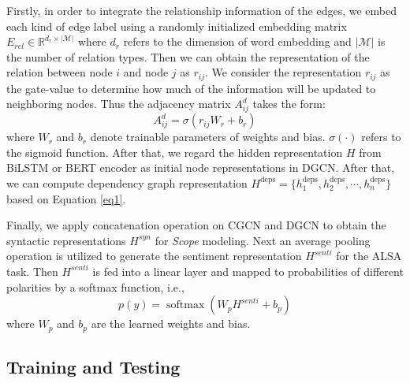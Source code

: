 \documentclass{article}
\begin{document}
Firstly, in order to integrate the relationship information of the edges, we  embed each kind of edge label using a randomly initialized embedding matrix $E_{rel} \in \mathbb{R}^{d_r \times |\mathcal{M}|}$ where $d_r$ refers to the dimension of word embedding and $|\mathcal{M}|$ is the number of relation types. Then we can obtain the representation of the relation between node $i$ and node $j$ as $r_{ij}$. We consider the representation $r_{ij}$ as the gate-value to determine how much of the information will be updated to neighboring nodes. Thus the adjacency matrix $A_{ij}^{d}$ takes the form:
\begin{equation}
	A_{ij}^{d} = \sigma\left(r_{ij} W_r + b_r\right) \label{eq4}
\end{equation}
where $W_r$ and $b_r$ denote trainable parameters of weights and bias. $\sigma(\cdot)$ refers to the sigmoid function. After that, we regard the hidden representation $H$ from BiLSTM or BERT encoder as initial node representations in DGCN. After that, we can compute dependency graph representation $ H^{\text{deps}} = \{h_1^{\text{deps}}, h_2^{\text{deps}}, \cdots, h_n^{\text{deps}}\} $ based on Equation \ref{eq1}. 

Finally, we apply concatenation operation on CGCN and DGCN to obtain the syntactic representations $H^{syn}$ for \emph{Scope} modeling. Next an average pooling operation is utilized to generate the sentiment representation $H^{senti}$ for the ALSA task. Then $H^{senti} $ is fed into a linear layer and mapped to probabilities of different polarities by a softmax function, i.e.,
\begin{equation}
	p(y)=\operatorname{softmax}\left(W_{p}H^{senti} + b_{p}\right) \label{eq5}
\end{equation}
where $W_p$ and $b_p$ are the learned weights and bias.

\subsection{Training and Testing}
\end{document}
